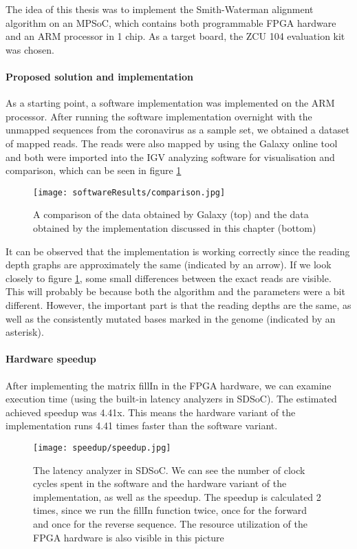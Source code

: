 The idea of this thesis was to implement the Smith-Waterman alignment algorithm on an MPSoC, which contains both programmable FPGA hardware and an ARM processor in 1 chip. As a target board, the ZCU 104 evaluation kit was chosen.

\paragraph{Proposed solution and implementation}

As a starting point, a software implementation was implemented on the ARM processor. After running the software implementation overnight with the unmapped sequences from the coronavirus as a sample set, we obtained a dataset of mapped reads. The reads were also mapped by using the Galaxy online tool \cite{13} and both were imported into the IGV analyzing software for visualisation and comparison, which can be seen in figure \ref{fig:IGVcomparisonConcl}

\begin{figure}[H]
	\centering
	\texttt{[image: softwareResults/comparison.jpg]}
	\caption{A comparison of the data obtained by Galaxy (top) and the data obtained by the implementation discussed in this chapter (bottom)}
	\label{fig:IGVcomparisonConcl}
\end{figure}

It can be observed that the implementation is working correctly since the reading depth graphs are approximately the same (indicated by an arrow). If we look closely to figure \ref{fig:IGVcomparisonConcl}, some small differences between the exact reads are visible. This will probably be because both the algorithm and the parameters were a bit different. However, the important part is that the reading depths are the same, as well as the consistently mutated bases marked in the genome (indicated by an asterisk).

\paragraph{Hardware speedup}

After implementing the matrix fillIn in the FPGA hardware, we can examine execution time (using the built-in latency analyzers in SDSoC). The estimated achieved speedup was 4.41x. This means the hardware variant of the implementation runs 4.41 times faster than the software variant.

\begin{figure}[H]
	\centering
	\texttt{[image: speedup/speedup.jpg]}
	\caption{The latency analyzer in SDSoC. We can see the number of clock cycles spent in the software and the hardware variant of the implementation, as well as the speedup. The speedup is calculated 2 times, since we run the fillIn function twice, once for the forward and once for the reverse sequence. The resource utilization of the FPGA hardware is also visible in this picture}
	\label{fig:speedupConcl}
\end{figure}





